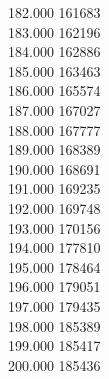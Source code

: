 { 182.000	161683 \\
 183.000	162196 \\
 184.000	162886 \\
 185.000	163463 \\
 186.000	165574 \\
 187.000	167027 \\
 188.000	167777 \\
 189.000	168389 \\
 190.000	168691 \\
 191.000	169235 \\
 192.000	169748 \\
 193.000	170156 \\
 194.000	177810 \\
 195.000	178464 \\
 196.000	179051 \\
 197.000	179435 \\
 198.000	185389 \\
 199.000	185417 \\
 200.000	185436 \\
}
